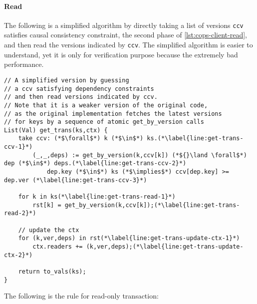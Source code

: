 \paragraph{\bf Read}
The following is a simplified algorithm by directly taking a list of versions 
\verb|ccv| satisfies causal consistency constraint,
\ie the second phase of \cref{lst:cops-client-read},
and then read the versions indicated by \verb|ccv|.
The simplified algorithm is easier to understand,
yet it is only for verification purpose because the extremely bad performance.
\begin{lstlisting}[caption={get\_trans},label={lst:get-trans}]
// A simplified version by guessing
// a ccv satisfying dependency constraints
// and then read versions indicated by ccv.
// Note that it is a weaker version of the original code,
// as the original implementation fetches the latest versions
// for keys by a sequence of atomic get_by_version calls
List(Val) get_trans(ks,ctx) {
    take ccv: (*$\forall$*) k (*$\in$*) ks.(*\label{line:get-trans-ccv-1}*)
        (_,_,deps) := get_by_version(k,ccv[k]) (*${}\land \forall$*) dep (*$\in$*) deps.(*\label{line:get-trans-ccv-2}*)
            dep.key (*$\in$*) ks (*$\implies$*) ccv[dep.key] >= dep.ver (*\label{line:get-trans-ccv-3}*)

    for k in ks(*\label{line:get-trans-read-1}*)
        rst[k] = get_by_version(k,ccv[k]);(*\label{line:get-trans-read-2}*)

    // update the ctx
    for (k,ver,deps) in rst(*\label{line:get-trans-update-ctx-1}*)
        ctx.readers += (k,ver,deps);(*\label{line:get-trans-update-ctx-2}*)

    return to_vals(ks);
}                                   
\end{lstlisting}

The following is the rule for read-only transaction:

